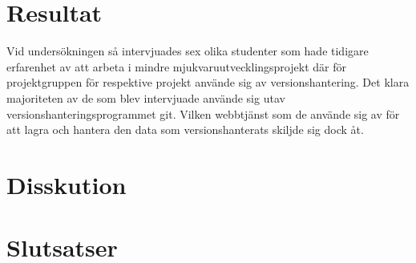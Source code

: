 \vspace{1.5em}
\section{Resultat}
Vid undersökningen så intervjuades sex olika studenter som hade tidigare erfarenhet av att arbeta i mindre mjukvaruutvecklingsprojekt där för projektgruppen för respektive projekt använde sig av versionshantering. Det klara majoriteten av de som blev intervjuade använde sig utav versionshanteringsprogrammet git. Vilken webbtjänst som de använde sig av för att lagra och hantera den data som versionshanterats skiljde sig dock åt.

\vspace{1.5em}
\section{Disskution}


\vspace{1.5em}
\section{Slutsatser}
